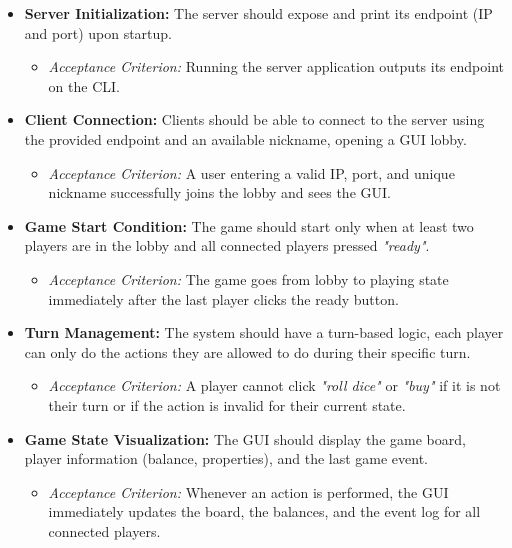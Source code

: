 \documentclass{scrartcl}
\begin{document}
\begin{itemize}
    \item \textbf{Server Initialization:} The server should expose and print its endpoint (IP and port) upon startup.
    \begin{itemize}
        \item \textit{Acceptance Criterion:} Running the server application outputs its endpoint on the CLI.
    \end{itemize}

    \item \textbf{Client Connection:} Clients should be able to connect to the server using the provided endpoint and an available nickname, opening a GUI lobby.
    \begin{itemize}
        \item \textit{Acceptance Criterion:} A user entering a valid IP, port, and unique nickname successfully joins the lobby and sees the GUI.
    \end{itemize}

    \item \textbf{Game Start Condition:} The game should start only when at least two players are in the lobby and all connected players pressed \textit{"ready"}.
    \begin{itemize}
        \item \textit{Acceptance Criterion:} The game goes from lobby to playing state immediately after the last player clicks the ready button.
    \end{itemize}

    \item \textbf{Turn Management:} The system should have a turn-based logic, each player can only do the actions they are allowed to do during their specific turn.
    \begin{itemize}
        \item \textit{Acceptance Criterion:} A player cannot click \textit{"roll dice"} or \textit{"buy"} if it is not their turn or if the action is invalid for their current state.
    \end{itemize}

    \item \textbf{Game State Visualization:} The GUI should display the game board, player information (balance, properties), and the last game event.
    \begin{itemize}
        \item \textit{Acceptance Criterion:} Whenever an action is performed, the GUI immediately updates the board, the balances, and the event log for all connected players.
    \end{itemize}


\end{itemize}
\end{document}

